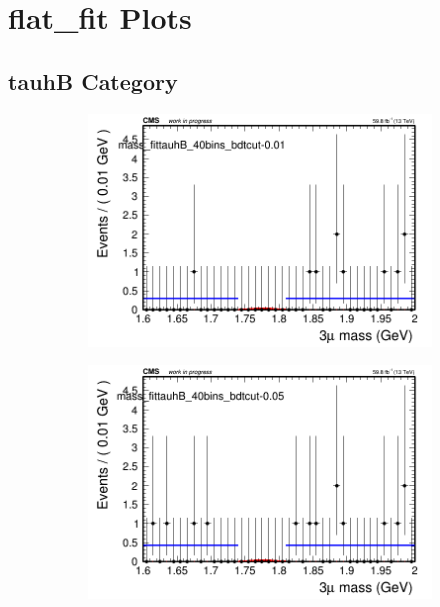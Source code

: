 \section{flat\_fit Plots}

\subsection{tauhB Category}
\label{sec:flatfittauhB}

\begin{figure}[H]
    \centering
    \begin{subfigure}{0.2\textwidth}
        \includegraphics[width=\textwidth]{flat_fit/plots/tauhB/massfit_tauhB_40bins_bdtcut-0.01.png}
        \caption{}
    \end{subfigure}
    \begin{subfigure}{0.2\textwidth}
        \includegraphics[width=\textwidth]{flat_fit/plots/tauhB/massfit_tauhB_40bins_bdtcut-0.05.png}

\end{subfigure}
\end{figure}
